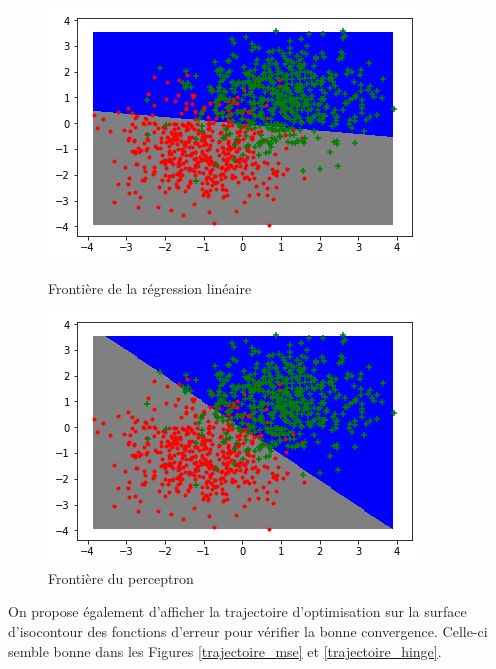 \documentclass[a4paper]{article}
\begin{document}
\begin{figure}[ht!]
\begin{center}
\begin{minipage}{0.45\textwidth}
\includegraphics[scale=0.5]{frontiere_mse.png}
\caption{Frontière de la régression linéaire}
\label{frontiere_mse}
\end{minipage}\hfill
\begin{minipage}{0.45\textwidth}
\includegraphics[scale=0.5]{frontiere_hinge.png}
\caption{Frontière du perceptron}
\label{frontiere_hinge}
\end{minipage}
\end{center}
\end{figure}

On propose également d'afficher la trajectoire d'optimisation sur la surface d'isocontour des fonctions d'erreur pour vérifier la bonne convergence. Celle-ci semble bonne dans les Figures \ref{trajectoire_mse} et \ref{trajectoire_hinge}.
\end{document}

